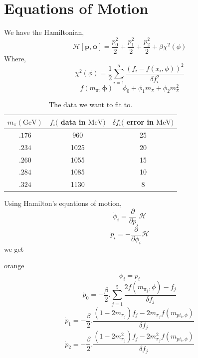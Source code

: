 \documentclass{cernatsnote}
\begin{document}
\section{Equations of Motion}
We have the Hamiltonian,
\begin{equation}
\mathcal{H}[\boldsymbol{p}, \boldsymbol{\phi}]=\frac{p_0^2}{2}+\frac{p_1^2}{2}+\frac{p_2^2}{2}+\beta \chi^2(\phi)
\end{equation}
Where,
\begin{equation}
    \chi^2(\phi)=\frac{1}{2} \sum_{i=1}^5 \frac{\left(f_i-f\left(x_i, \phi\right)\right)^2}{\delta f_i^2}
\end{equation}
\begin{equation} \label{3}
    f\left(m_\pi, \boldsymbol{\phi}\right)=\phi_0+\phi_1 m_\pi+\phi_2 m_\pi^2
\end{equation}
\begin{table}[H]
\centering
    \begin{tabular}{c|c|c}
        $m_\pi(\mathrm{GeV})$ & $f_i($ data in $\mathrm{MeV})$ & $\delta f_i($ error in $\mathrm{MeV})$ \\
        \hline 
        $.176$ & 960 & 25 \\
        $.234$ & 1025 & 20 \\
        $.260$ & 1055 & 15 \\
        $.284$ & 1085 & 10 \\
        $.324$ & 1130 & 8 \\
        \hline
    \end{tabular}
\caption{The data we want to fit to.}
\label{tab:data}
\end{table}
Using Hamilton's equations of motion, 
\begin{equation} \label{ham_1}
    \dot{\phi}_{i}=\frac{\partial}{\partial p}_{i} \mathcal{H}
\end{equation}
\begin{equation} \label{ham_2}
    \dot{p}_{i}=-\frac{\partial}{\partial \phi_{i}} \mathcal{H}
\end{equation}
we get
\begin{mybox}{orange}{}
\begin{equation}
    \dot{\phi_{i}} = p_{i} 
\end{equation}
\begin{equation}
    \dot{p}_{0} = - \frac{\beta}{2} . \sum^{5}_{j = 1} \frac{2f(m_{\pi_{j}}, \phi)-f_{j}}{\delta f_{j}}
\end{equation}
\begin{equation}
    \dot{p}_{1} = -\frac{\beta}{2} .  \frac{(1-2m_{\pi_j})f_{j}-2m_{\pi_j}f(m_{pi_{i}, \phi})}{\delta f_{j}}
\end{equation}
\begin{equation}
    \dot{p}_2 = -\frac{\beta}{2} .  \frac{(1-2m^{2}_{\pi_j})f_{j}-2m^{2}_{\pi_j}f(m_{pi_{i}, \phi})}{\delta f_{j}}
\end{equation}
\end{mybox}
\end{document}
